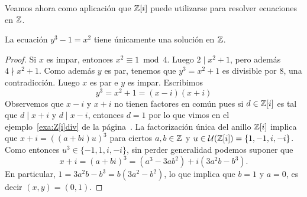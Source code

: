 Veamos ahora como aplicación que $\mathbb{Z}[i]$ puede utilizarse para resolver ecuaciones en $\mathbb{Z}$. 	
	
\begin{proposition}
La ecuación $y^3-1=x^2$ tiene únicamente una solución en $\mathbb{Z}$.
\end{proposition}

\begin{proof} 
Si $x$ es impar, entonces $x^2\equiv 1\bmod 4$. Luego $2\mid x^2+1$, pero además $4\nmid x^2+1$. Como además $y$ es par, tenemos
que $y^3=x^2+1$ es divisible por $8$, una contradicción. Luego $x$ es par e $y$ es impar. Escribimos
\[
y^3=x^2+1=(x-i)(x+i)
\]
Observemos que $x-i$ y $x+i$ no tienen factores en común pues si $d\in\mathbb{Z}[i]$ es tal que
$d\mid x+i$ y $d\mid x-i$, entonces $d=1$ por lo que vimos en el ejemplo~\ref{exa:Z[i]div} de la página~\pageref{exa:Z[i]div}. La factorización
única del anillo $\mathbb{Z}[i]$ implica que $x+i=((a+bi)u)^3$ para ciertos $a,b\in\mathbb{Z}$ y $u\in\mathcal{U}(\mathbb{Z}[i])=\{1,-1,i,-i\}$. 
Como entonces $u^3\in\{-1,1,i,-i\}$, sin perder generalidad podemos suponer que 
\[
x+i=(a+bi)^3=(a^3-3ab^2)+i(3a^2b-b^3).
\]
En particular, $1=3a^2b-b^3=b(3a^2-b^2)$, lo que implica que $b=1$ y $a=0$, es decir $(x,y)=(0,1)$. 
\end{proof}
